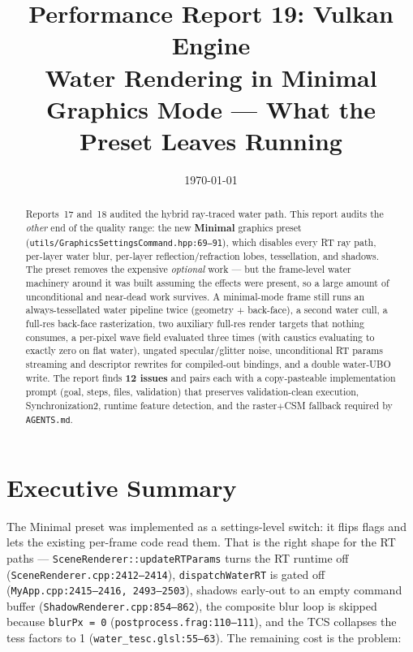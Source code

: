 \documentclass[11pt,a4paper]{article}
\title{Performance Report 19: Vulkan Engine \\
\large Water Rendering in Minimal Graphics Mode --- What the Preset Leaves Running}
\author{}
\date{\today}
\begin{document}
\maketitle

\begin{abstract}
Reports~17 and~18 audited the hybrid ray-traced water path. This report audits the \emph{other} end of the quality range: the new \textbf{Minimal} graphics preset
(\texttt{utils/GraphicsSettingsCommand.hpp:69--91}), which disables every RT ray path, per-layer water blur, per-layer reflection/refraction lobes, tessellation, and shadows.
The preset removes the expensive \emph{optional} work --- but the frame-level water machinery around it was built assuming the effects were present, so a large amount of
unconditional and near-dead work survives. A minimal-mode frame still runs an always-tessellated water pipeline twice (geometry $+$ back-face), a second water cull, a full-res
back-face rasterization, two auxiliary full-res render targets that nothing consumes, a per-pixel wave field evaluated three times (with caustics evaluating to exactly zero on
flat water), ungated specular/glitter noise, unconditional RT params streaming and descriptor rewrites for compiled-out bindings, and a double water-UBO write.
The report finds \textbf{12 issues} and pairs each with a copy-pasteable implementation prompt (goal, steps, files, validation) that preserves validation-clean execution,
Synchronization2, runtime feature detection, and the raster$+$CSM fallback required by \texttt{AGENTS.md}.
\end{abstract}

\tableofcontents
\newpage

\section{Executive Summary}

The Minimal preset was implemented as a settings-level switch: it flips flags and lets the existing per-frame code read them. That is the right shape for the RT paths ---
\texttt{SceneRenderer::updateRTParams} turns the RT runtime off (\texttt{SceneRenderer.cpp:2412--2414}), \texttt{dispatchWaterRT} is gated off
(\texttt{MyApp.cpp:2415--2416, 2493--2503}), shadows early-out to an empty command buffer (\texttt{ShadowRenderer.cpp:854--862}), the composite blur loop is skipped because
\texttt{blurPx = 0} (\texttt{postprocess.frag:110--111}), and the TCS collapses the tess factors to 1 (\texttt{water\_tesc.glsl:55--63}). The remaining cost is the problem:
\end{document}
